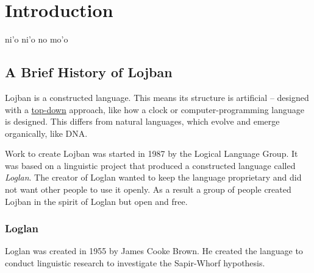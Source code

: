 \documentclass[12pt]{book}
\begin{document}

\tableofcontents

\chapter{Introduction}

ni'o ni'o no mo'o

\section{A Brief History of Lojban}

Lojban is a constructed language. This means its structure is artificial -- designed with a \href{https://en.wikipedia.org/wiki/Top-down_and_bottom-up_design}{top-down} approach, like how a clock or computer-programming language is designed. This differs from natural languages, which evolve and emerge organically, like DNA. \cite{nature24455} 



Work to create Lojban was started in 1987 by the Logical Language Group. It was based on a linguistic project that produced a constructed language called \emph{Loglan}. The creator of Loglan wanted to keep the language proprietary and did not want other people to use it openly. As a result a group of people created Lojban in the spirit of Loglan but open and free.  

\subsection{Loglan}

Loglan was created in 1955 by James Cooke Brown. He created the language to conduct linguistic research to investigate the Sapir-Whorf hypothesis.
\end{document}
